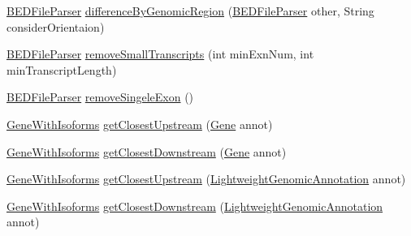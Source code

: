 \begin{DoxyCompactItemize}
$$\hyperlink{classbroad_1_1pda_1_1annotation_1_1_b_e_d_file_parser}{B\+E\+D\+File\+Parser} \hyperlink{classbroad_1_1pda_1_1annotation_1_1_b_e_d_file_parser_abbb99614e434ca01ec8d4cec6e6d09f8}{difference\+By\+Genomic\+Region} (\hyperlink{classbroad_1_1pda_1_1annotation_1_1_b_e_d_file_parser}{B\+E\+D\+File\+Parser} other, String consider\+Orientaion)
\item 
\hyperlink{classbroad_1_1pda_1_1annotation_1_1_b_e_d_file_parser}{B\+E\+D\+File\+Parser} \hyperlink{classbroad_1_1pda_1_1annotation_1_1_b_e_d_file_parser_a509eea26bf47a59f6d0b34dbe6232f3b}{remove\+Small\+Transcripts} (int min\+Exn\+Num, int min\+Transcript\+Length)
\item 
\hyperlink{classbroad_1_1pda_1_1annotation_1_1_b_e_d_file_parser}{B\+E\+D\+File\+Parser} \hyperlink{classbroad_1_1pda_1_1annotation_1_1_b_e_d_file_parser_a75f7e2603b219a99a583421044f9d7f5}{remove\+Singele\+Exon} ()
\item 
\hyperlink{classbroad_1_1pda_1_1gene_1_1_gene_with_isoforms}{Gene\+With\+Isoforms} \hyperlink{classbroad_1_1pda_1_1annotation_1_1_b_e_d_file_parser_a01bdda303f0aa5c707342733e3bb09c2}{get\+Closest\+Upstream} (\hyperlink{classumms_1_1core_1_1annotation_1_1_gene}{Gene} annot)
\item 
\hyperlink{classbroad_1_1pda_1_1gene_1_1_gene_with_isoforms}{Gene\+With\+Isoforms} \hyperlink{classbroad_1_1pda_1_1annotation_1_1_b_e_d_file_parser_a17134d7932aab01f1cb7783f60bbded9}{get\+Closest\+Downstream} (\hyperlink{classumms_1_1core_1_1annotation_1_1_gene}{Gene} annot)
\item 
\hyperlink{classbroad_1_1pda_1_1gene_1_1_gene_with_isoforms}{Gene\+With\+Isoforms} \hyperlink{classbroad_1_1pda_1_1annotation_1_1_b_e_d_file_parser_aba76d598eb442f6fca3fe1f37dc9b6d0}{get\+Closest\+Upstream} (\hyperlink{interfacebroad_1_1core_1_1annotation_1_1_lightweight_genomic_annotation}{Lightweight\+Genomic\+Annotation} annot)
\item 
\hyperlink{classbroad_1_1pda_1_1gene_1_1_gene_with_isoforms}{Gene\+With\+Isoforms} \hyperlink{classbroad_1_1pda_1_1annotation_1_1_b_e_d_file_parser_a84ceb76583ae1aed2022368c2fb07f14}{get\+Closest\+Downstream} (\hyperlink{interfacebroad_1_1core_1_1annotation_1_1_lightweight_genomic_annotation}{Lightweight\+Genomic\+Annotation} annot)
\end{DoxyCompactItemize}
